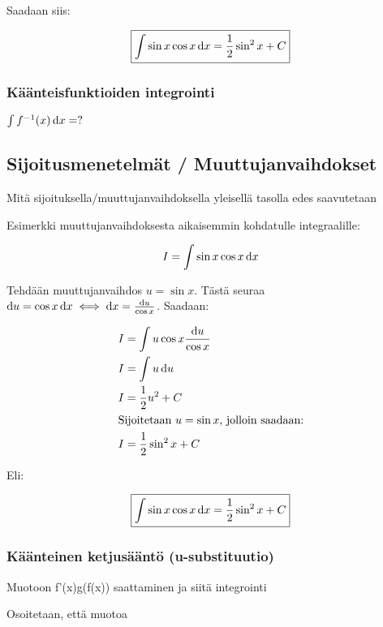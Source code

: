 \documentclass[../integrointiopas.tex]{subfiles}
\begin{document}
	Saadaan siis:
	
	\begin{equation*}
		\boxed{\int\sin x \cos x\odif{x} = \frac{1}{2}\sin^2x + C}
	\end{equation*}
	
	\subsubsection{Käänteisfunktioiden integrointi}
	
	$\int f^{-1}(x)\odif{x} = ?$

	\subsection{Sijoitusmenetelmät / Muuttujanvaihdokset}
	
	Mitä sijoituksella/muuttujanvaihdoksella yleisellä tasolla edes saavutetaan
	
	Esimerkki muuttujanvaihdoksesta aikaisemmin kohdatulle integraalille:
	
	\begin{equation*}
		I = \int \sin x\cos x\odif{x}
	\end{equation*}

	Tehdään muuttujanvaihdos $u = \sin x$. Tästä seuraa $\odif{u} = \cos x\odif{x} \iff \odif{x} = \frac{\odif{u}}{\cos x}$. Saadaan:
	
	\begin{align*}
		I &= \int u\cos x\frac{\odif{u}}{\cos x} \\
		I &= \int u\odif{u} \\
		I &= \frac{1}{2}u^2 + C \\
		\intertext{Sijoitetaan $u = \sin x$, jolloin saadaan:}
		I &= \frac{1}{2}\sin^2x + C
	\end{align*}

	Eli:
	
	\begin{equation*}
		\boxed{\int \sin x\cos x\odif{x} = \frac{1}{2}\sin^2x + C}
	\end{equation*}
	
	\subsubsection{Käänteinen ketjusääntö (u-substituutio)}
	
	Muotoon f'(x)g(f(x)) saattaminen ja siitä integrointi
	
	Osoitetaan, että muotoa 
	
	
\end{document}
